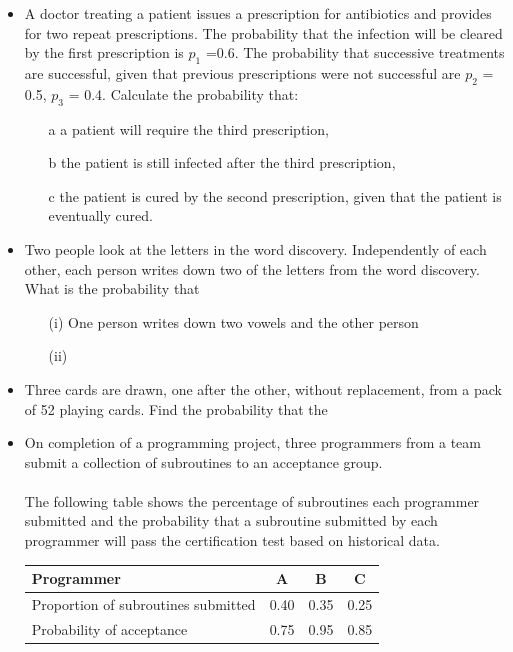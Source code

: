 \documentclass[12pt]{report}
\begin{document}
\begin{itemize}
	\item A doctor treating a patient issues a prescription for antibiotics and provides for two repeat prescriptions. The probability that the infection will be cleared by the first prescription is $p_1$ =0.6.
	The probability that successive treatments are successful, given that previous prescriptions were not successful are $p_2$ = 0.5, $p_3$ = 0.4. Calculate the probability that:
	
	\begin{itemize}
		\item[a] a patient will require the third prescription,
		\item[b] the patient is still infected after the third prescription,
		\item[c] the patient is cured by the second prescription, given that the patient is eventually cured.
	\end{itemize}
	
	\item Two people look at the letters in the word discovery. Independently of each other, each person writes down two of the letters from the word discovery.
	What is the probability that
	\begin{itemize}
		\item[(i)] One person writes down two vowels and the other person 
		\item[(ii)]
	\end{itemize}
	
	\item Three cards are drawn, one after the other, without replacement, from a pack of 52 playing cards.
	Find the probability that the
	
	
	
	
	
	\item
	On completion of a programming project, three programmers from a team submit a collection of subroutines to an acceptance group. \\
	\\
	The following table shows the percentage of subroutines each programmer submitted and the probability that a subroutine submitted by each programmer will pass the certification test based on historical data.
	
	\begin{center}
		\begin{tabular}{|l|c|c|c|}
			\hline
			Programmer &	A	&B	& C	\\\hline
			Proportion of subroutines submitted&	0.40	&0.35	&0.25	\\ \hline
			Probability of acceptance	&0.75	&0.95	&0.85\\
			
			\hline
		\end{tabular}
	\end{center}
\end{itemize}
\end{document}
